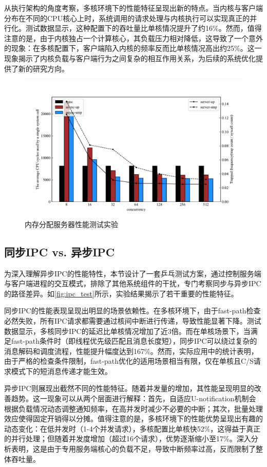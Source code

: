 从执行架构的角度考察，多核环境下的性能特征呈现出新的特点。当内核与客户端分布在不同的CPU核心上时，系统调用的请求处理与内核执行可以实现真正的并行化。测试数据显示，这种配置下的吞吐量比单核情况提升了约16\%。然而，值得注意的是，由于内核独占一个计算核心，其负载压力相对降低，这导致了一个意外的现象：在多核配置下，客户端陷入内核的频率反而比单核情况高出约25\%。这一现象揭示了内核负载与客户端行为之间复杂的相互作用关系，为后续的系统优化提供了新的研究方向。

\begin{figure}[htbp]
    \centering
    \includegraphics[width=1.0\textwidth]{figures/syscall_test.pdf}
    \caption{内存分配服务器性能测试实验}\label{fig:syscall_test}
\end{figure}

\subsection{同步IPC vs. 异步IPC}
为深入理解异步IPC的性能特性，本节设计了一套乒乓测试方案，通过控制服务端与客户端进程的交互模式，排除了其他系统组件的干扰，专门考察同步与异步IPC的路径差异。如\ref{fig:ipc_test}所示，实验结果揭示了若干重要的性能特征。

同步IPC的性能表现呈现出明显的场景依赖性。在多核环境下，由于fast-path检查必然失败，所有IPC请求都需要通过核间中断进行传递，导致性能显著下降。测试数据显示，多核同步IPC的延迟比单核情况增加了近3倍。而在单核场景下，当满足fast-path条件时（即线程优先级匹配且消息长度短），同步IPC可以绕过复杂的消息解码和调度流程，性能提升幅度达到167\%。然而，实际应用中的统计表明，由于严格的检查条件限制，fast-path优化的适用场景相当有限，仅在单核且C/S请求模式下的短消息传递才能生效。

异步IPC则展现出截然不同的性能特征。随着并发量的增加，其性能呈现明显的改善趋势。这一现象可以从两个层面进行解释：首先，自适应U-notification机制会根据负载情况动态调整通知频率，在高并发时减少不必要的中断；其次，批量处理效应使得固定开销得以分摊。值得注意的是，多核环境下的性能优势呈现出有趣的动态变化：在低并发时（1-4个并发请求），多核配置比单核快52\%，这得益于真正的并行处理；但随着并发度增加（超过16个请求），优势逐渐缩小至17\%。深入分析表明，这是由于专用服务端核心的负载不足，导致中断频率过高，反而限制了整体吞吐量。

